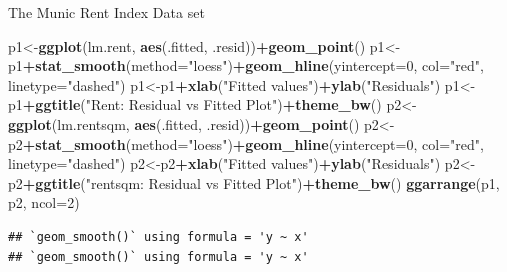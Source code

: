 \documentclass[
  ignorenonframetext,
]{beamer}
\newenvironment{Shaded}{\begin{snugshade}}{\end{snugshade}}
\newcommand{\AttributeTok}[1]{\textcolor[rgb]{0.13,0.29,0.53}{#1}}
\newcommand{\DecValTok}[1]{\textcolor[rgb]{0.00,0.00,0.81}{#1}}
\newcommand{\FunctionTok}[1]{\textcolor[rgb]{0.13,0.29,0.53}{\textbf{#1}}}
\newcommand{\NormalTok}[1]{#1}
\newcommand{\OtherTok}[1]{\textcolor[rgb]{0.56,0.35,0.01}{#1}}
\newcommand{\SpecialCharTok}[1]{\textcolor[rgb]{0.81,0.36,0.00}{\textbf{#1}}}
\newcommand{\StringTok}[1]{\textcolor[rgb]{0.31,0.60,0.02}{#1}}
\begin{document}
\begin{frame}[fragile]
\begin{block}{The Munic Rent Index Data set}
\begin{Shaded}
\begin{Highlighting}[]
\NormalTok{p1}\OtherTok{\textless{}{-}}\FunctionTok{ggplot}\NormalTok{(lm.rent, }\FunctionTok{aes}\NormalTok{(.fitted, .resid))}\SpecialCharTok{+}\FunctionTok{geom\_point}\NormalTok{()}
\NormalTok{p1}\OtherTok{\textless{}{-}}\NormalTok{p1}\SpecialCharTok{+}\FunctionTok{stat\_smooth}\NormalTok{(}\AttributeTok{method=}\StringTok{"loess"}\NormalTok{)}\SpecialCharTok{+}\FunctionTok{geom\_hline}\NormalTok{(}\AttributeTok{yintercept=}\DecValTok{0}\NormalTok{, }\AttributeTok{col=}\StringTok{"red"}\NormalTok{, }\AttributeTok{linetype=}\StringTok{"dashed"}\NormalTok{)}
\NormalTok{p1}\OtherTok{\textless{}{-}}\NormalTok{p1}\SpecialCharTok{+}\FunctionTok{xlab}\NormalTok{(}\StringTok{"Fitted values"}\NormalTok{)}\SpecialCharTok{+}\FunctionTok{ylab}\NormalTok{(}\StringTok{"Residuals"}\NormalTok{)}
\NormalTok{p1}\OtherTok{\textless{}{-}}\NormalTok{p1}\SpecialCharTok{+}\FunctionTok{ggtitle}\NormalTok{(}\StringTok{"Rent: Residual vs Fitted Plot"}\NormalTok{)}\SpecialCharTok{+}\FunctionTok{theme\_bw}\NormalTok{()}
\NormalTok{p2}\OtherTok{\textless{}{-}}\FunctionTok{ggplot}\NormalTok{(lm.rentsqm, }\FunctionTok{aes}\NormalTok{(.fitted, .resid))}\SpecialCharTok{+}\FunctionTok{geom\_point}\NormalTok{()}
\NormalTok{p2}\OtherTok{\textless{}{-}}\NormalTok{p2}\SpecialCharTok{+}\FunctionTok{stat\_smooth}\NormalTok{(}\AttributeTok{method=}\StringTok{"loess"}\NormalTok{)}\SpecialCharTok{+}\FunctionTok{geom\_hline}\NormalTok{(}\AttributeTok{yintercept=}\DecValTok{0}\NormalTok{, }\AttributeTok{col=}\StringTok{"red"}\NormalTok{, }\AttributeTok{linetype=}\StringTok{"dashed"}\NormalTok{)}
\NormalTok{p2}\OtherTok{\textless{}{-}}\NormalTok{p2}\SpecialCharTok{+}\FunctionTok{xlab}\NormalTok{(}\StringTok{"Fitted values"}\NormalTok{)}\SpecialCharTok{+}\FunctionTok{ylab}\NormalTok{(}\StringTok{"Residuals"}\NormalTok{)}
\NormalTok{p2}\OtherTok{\textless{}{-}}\NormalTok{p2}\SpecialCharTok{+}\FunctionTok{ggtitle}\NormalTok{(}\StringTok{"rentsqm: Residual vs Fitted Plot"}\NormalTok{)}\SpecialCharTok{+}\FunctionTok{theme\_bw}\NormalTok{()}
\FunctionTok{ggarrange}\NormalTok{(p1, p2, }\AttributeTok{ncol=}\DecValTok{2}\NormalTok{)}
\end{Highlighting}
\end{Shaded}

\begin{verbatim}
## `geom_smooth()` using formula = 'y ~ x'
## `geom_smooth()` using formula = 'y ~ x'
\end{verbatim}


\end{block}
\end{frame}
\end{document}

